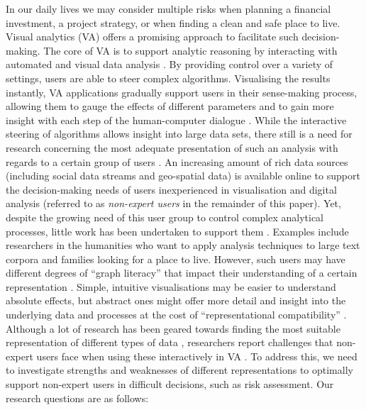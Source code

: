 \documentclass[final,5p,times,twocolumn,authoryear]{elsarticle}
\begin{document}
In our daily lives we may consider multiple risks when planning a financial investment, a project strategy, or when finding a clean and safe place to live. Visual analytics (VA) offers a promising approach to facilitate such decision-making. The core of VA is to support analytic reasoning by interacting with automated and visual data analysis \citep{keim_visual_2008}. By providing control over a variety of settings, users are able to steer complex algorithms. Visualising the results instantly, VA applications gradually support users in their sense-making process, allowing them to gauge the effects of different parameters and to gain more insight with each step of the human-computer dialogue \citep{yi2007toward}. While the interactive steering of algorithms allows insight into large data sets, there still is a need for research concerning the most adequate presentation of such an analysis with regards to a certain group of users \citep{speier2006influence, gettinger2012shall}. An increasing amount of rich data sources (including social data streams and geo-spatial data) is available online to support the decision-making needs of users inexperienced in visualisation and digital analysis (referred to as \emph{non-expert users} in the remainder of this paper). Yet, despite the growing need of this user group to control complex analytical processes, little work has been undertaken to support them \citep{keim2010mastering}. Examples include researchers in the humanities who want to apply analysis techniques to large text corpora \citep{john} and families looking for a place to live. %
However, such users may have different degrees of ``graph literacy'' that impact their understanding of a certain representation \citep{pinker_theory_1990}. Simple, intuitive visualisations may be easier to understand absolute effects, but abstract ones might offer more detail and insight into the underlying data and processes at the cost of ``representational compatibility'' \citep{sparrow_graphical_1989}. Although a lot of research has been geared towards finding the most suitable representation of different types of data \citep{Wongsuphasawat2016}, researchers report challenges that non-expert users face when using these interactively in VA \citep{huang2015personal,kwon2011visual}. To address this, we need to investigate strengths and weaknesses of different representations to optimally support non-expert users in difficult decisions, such as risk assessment. Our research questions are as follows: 
\end{document}
